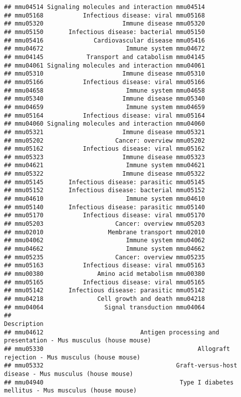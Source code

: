\documentclass[
]{article}
\begin{document}
\begin{verbatim}
## mmu04514 Signaling molecules and interaction mmu04514
## mmu05168           Infectious disease: viral mmu05168
## mmu05320                      Immune disease mmu05320
## mmu05150       Infectious disease: bacterial mmu05150
## mmu05416              Cardiovascular disease mmu05416
## mmu04672                       Immune system mmu04672
## mmu04145            Transport and catabolism mmu04145
## mmu04061 Signaling molecules and interaction mmu04061
## mmu05310                      Immune disease mmu05310
## mmu05166           Infectious disease: viral mmu05166
## mmu04658                       Immune system mmu04658
## mmu05340                      Immune disease mmu05340
## mmu04659                       Immune system mmu04659
## mmu05164           Infectious disease: viral mmu05164
## mmu04060 Signaling molecules and interaction mmu04060
## mmu05321                      Immune disease mmu05321
## mmu05202                    Cancer: overview mmu05202
## mmu05162           Infectious disease: viral mmu05162
## mmu05323                      Immune disease mmu05323
## mmu04621                       Immune system mmu04621
## mmu05322                      Immune disease mmu05322
## mmu05145       Infectious disease: parasitic mmu05145
## mmu05152       Infectious disease: bacterial mmu05152
## mmu04610                       Immune system mmu04610
## mmu05140       Infectious disease: parasitic mmu05140
## mmu05170           Infectious disease: viral mmu05170
## mmu05203                    Cancer: overview mmu05203
## mmu02010                  Membrane transport mmu02010
## mmu04062                       Immune system mmu04062
## mmu04662                       Immune system mmu04662
## mmu05235                    Cancer: overview mmu05235
## mmu05163           Infectious disease: viral mmu05163
## mmu00380               Amino acid metabolism mmu00380
## mmu05165           Infectious disease: viral mmu05165
## mmu05142       Infectious disease: parasitic mmu05142
## mmu04218               Cell growth and death mmu04218
## mmu04064                 Signal transduction mmu04064
##                                                                                         Description
## mmu04612                           Antigen processing and presentation - Mus musculus (house mouse)
## mmu05330                                           Allograft rejection - Mus musculus (house mouse)
## mmu05332                                     Graft-versus-host disease - Mus musculus (house mouse)
## mmu04940                                      Type I diabetes mellitus - Mus musculus (house mouse)

\end{verbatim}
\end{document}
